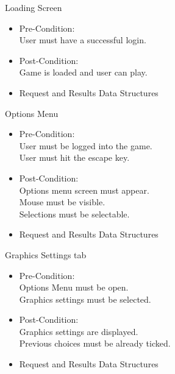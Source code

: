 \documentclass[letterpaper]{article}
\begin{document}
				\vspace{0.1in}Loading Screen
					\begin{itemize}
						\item Pre-Condition: \\
							User must have a successful login. \\
						\item Post-Condition: \\
						 	Game is loaded and user can play. \\
						\item Request and Results Data Structures \\
						
					\end{itemize}	
								
				\vspace{0.1in}Options Menu
					\begin{itemize}
						\item Pre-Condition: \\
							User must be logged into the game. \\
							User must hit the escape key. \\
						\item Post-Condition: \\
							Options menu screen must appear. \\
							Mouse must be visible. \\
							Selections must be selectable. \\
						\item Request and Results Data Structures \\
						
					\end{itemize}	
									
				\vspace{0.1in}Graphics Settings tab
					\begin{itemize}
						\item Pre-Condition: \\
							Options Menu must be open. \\
							Graphics settings must be selected. \\
						\item Post-Condition: \\
							Graphics settings are displayed. \\
							Previous choices must be already ticked. \\
						\item Request and Results Data Structures \\
						
					\end{itemize}									
									
\end{document}
